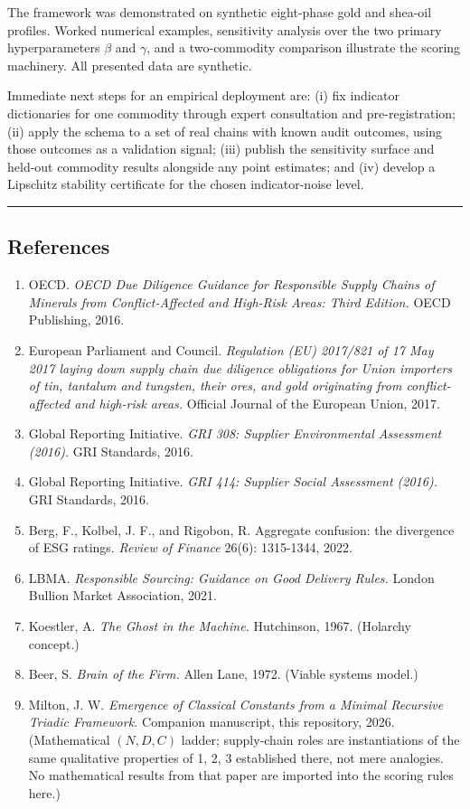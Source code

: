\documentclass[
  11pt,
  letterpaper,
]{article}
\providecommand{\tightlist}{%
  \setlength{\itemsep}{0pt}\setlength{\parskip}{0pt}}
\begin{document}
The framework was demonstrated on synthetic eight-phase gold and
shea-oil profiles. Worked numerical examples, sensitivity analysis over
the two primary hyperparameters \(\beta\) and \(\gamma\), and a
two-commodity comparison illustrate the scoring machinery. All presented
data are synthetic.

Immediate next steps for an empirical deployment are: (i) fix indicator
dictionaries for one commodity through expert consultation and
pre-registration; (ii) apply the schema to a set of real chains with
known audit outcomes, using those outcomes as a validation signal; (iii)
publish the sensitivity surface and held-out commodity results alongside
any point estimates; and (iv) develop a Lipschitz stability certificate
for the chosen indicator-noise level.

\begin{center}\rule{0.5\linewidth}{0.5pt}\end{center}

\subsection{References}\label{references}

\begin{enumerate}
\def\labelenumi{\arabic{enumi}.}
\tightlist
\item
  OECD. \emph{OECD Due Diligence Guidance for Responsible Supply Chains
  of Minerals from Conflict-Affected and High-Risk Areas: Third
  Edition.} OECD Publishing, 2016.
\item
  European Parliament and Council. \emph{Regulation (EU) 2017/821 of 17
  May 2017 laying down supply chain due diligence obligations for Union
  importers of tin, tantalum and tungsten, their ores, and gold
  originating from conflict-affected and high-risk areas.} Official
  Journal of the European Union, 2017.
\item
  Global Reporting Initiative. \emph{GRI 308: Supplier Environmental
  Assessment (2016).} GRI Standards, 2016.
\item
  Global Reporting Initiative. \emph{GRI 414: Supplier Social Assessment
  (2016).} GRI Standards, 2016.
\item
  Berg, F., Kolbel, J. F., and Rigobon, R. Aggregate confusion: the
  divergence of ESG ratings. \emph{Review of Finance} 26(6): 1315-1344,
  2022.
\item
  LBMA. \emph{Responsible Sourcing: Guidance on Good Delivery Rules.}
  London Bullion Market Association, 2021.
\item
  Koestler, A. \emph{The Ghost in the Machine.} Hutchinson, 1967.
  (Holarchy concept.)
\item
  Beer, S. \emph{Brain of the Firm.} Allen Lane, 1972. (Viable systems
  model.)
\item
  Milton, J. W. \emph{Emergence of Classical Constants from a Minimal
  Recursive Triadic Framework.} Companion manuscript, this repository,
  2026. (Mathematical \((N,D,C)\) ladder; supply-chain roles are
  instantiations of the same qualitative properties of 1, 2, 3
  established there, not mere analogies. No mathematical results from
  that paper are imported into the scoring rules here.)
\end{enumerate}
\end{document}
